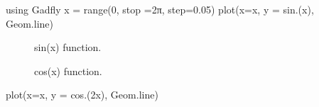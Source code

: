 \begin{juliacode}
using Gadfly
x = range(0, stop =2π, step=0.05)
plot(x=x, y = sin.(x), Geom.line)
\end{juliacode}
\begin{figure}[ht]
\center
\resizebox{\linewidth}{!}{}
\caption{sin(x) function.}
\label{fig:sin_fun}
\end{figure}

\begin{figure}[htpb]
\center
\resizebox{\linewidth}{!}{}
\caption{cos(x) function.}
\end{figure}

\begin{juliacode}
plot(x=x, y = cos.(2x), Geom.line)
\end{juliacode}
\resizebox{15cm}{!}{}
